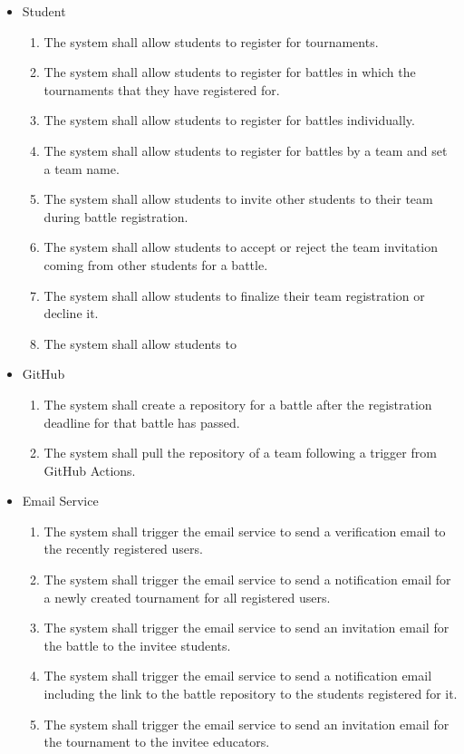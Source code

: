 \begin{itemize}
	\item Student
        \begin{enumerate}[resume]
		\item The system shall allow students to register for tournaments.
		\item The system shall allow students to register for battles in which the tournaments that they have registered for.
  \item The system shall allow students to register for battles individually.
  \item The system shall allow students to register for battles by a team and set a team name.
  \item The system shall allow students to invite other students to their team during battle registration.
  \item The system shall allow students to accept or reject the team invitation coming from other students for a battle.
  \item The system shall allow students to finalize their team registration or decline it.
  \item The system shall allow students to 
  
	\end{enumerate}


 \item GitHub
  \begin{enumerate}[resume]
     \item The system shall create a repository for a battle after the registration deadline for that battle has passed.
     \item The system shall pull the repository of a team following a trigger from GitHub Actions.
 \end{enumerate}


 \item Email Service
 \begin{enumerate}[resume]
    \item The system shall trigger the email service to send a verification email to the recently registered users.
    \item The system shall trigger the email service to send a notification email for a newly created tournament for all registered users.
    \item The system shall trigger the email service to send an invitation email for the battle to the invitee students.
    \item The system shall trigger the email service to send a notification email including the link to the battle repository to the students registered for it.
    \item The system shall trigger the email service to send an invitation email for the tournament to the invitee educators.
 \end{enumerate}



\end{itemize}
